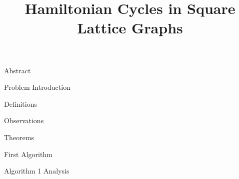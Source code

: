 \documentclass[a4paper,12pt]{article}
\title{Hamiltonian Cycles in Square Lattice Graphs}
\begin{document}
\date{\vspace{-5ex}}
\maketitle
\tableofcontents
\doublespacing

 {Abstract}

 {Problem Introduction}

 {Definitions}

 {Observations}

 {Theorems}

 {First Algorithm}

 {Algorithm 1 Analysis}

\pagebreak
\nocite{*}
\printbibliography
\end{document}
